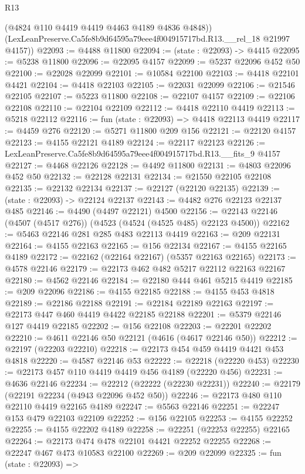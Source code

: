 \begin{lexlean}{R13}
\begin{coremodule}
        (@4824 @110 @4419 @4419 @4463 @4189 @4836 @4848))
      (LexLeanPreserve.Ca5fe8b9d64595a79eee4f004915717bd.R13.__rel_18 @21997 @4157))
@22093 := @4488 @11800
@22094 := (state : @22093) -> @4415
@22095 := @5238 @11800
@22096 := @22095 @4157
@22099 := @5237 @22096 @452 @50
@22100 := @22028 @22099
@22101 := @10584 @22100
@22103 := @4418 @22101 @4421
@22104 := @4418 @22103
@22105 := @22031 @22099
@22106 := @21546 @22105
@22107 := @5223 @11800
@22108 := @22107 @4157
@22109 := @22106 @22108
@22110 := @22104 @22109
@22112 := @4418 @22110 @4419
@22113 := @5218 @22112
@22116 := fun (state : @22093) => @4418 @22113 @4419
@22117 := @4459 @276
@22120 := @5271 @11800 @209 @156
@22121 := @22120 @4157
@22123 := @4155 @22121 @4189
@22124 := @22117 @22123
@22126 := LexLeanPreserve.Ca5fe8b9d64595a79eee4f004915717bd.R13.__fits_9 @4157
@22127 := @4468 @22126
@22128 := @4492 @11800
@22131 := @4803 @22096 @452 @50
@22132 := @22128 @22131
@22134 := @21550 @22105 @22108
@22135 := @22132 @22134
@22137 := @22127 (@22120 @22135)
@22139 := (state : @22093) -> @22124 @22137
@22143 := @4482 @276 @22123 @22137 @485
@22146 := @4490 (@4497 @22121) @4500
@22156 := @22143 @22146 (@4507 (@4517 @276)) (@4523 (@4524 (@4525 @485) @22123 @4500))
@22162 := @5463 @22146 @281 @285 @483 @22113 @4419
@22163 := @209 @22131
@22164 := @4155 @22163
@22165 := @156 @22134
@22167 := @4155 @22165 @4189
@22172 := @22162 (@22164 @22167) (@5357 @22163 @22165)
@22173 := @4578 @22146
@22179 := @22173 @462 @482 @5217 @22112 @22163 @22167
@22180 := @4562 @22146
@22184 := @22180 @444 @461 @5215 @4419
@22185 := @209 @22096
@22186 := @4155 @22185
@22188 := @4155 @453 @4818
@22189 := @22186 @22188
@22191 := @22184 @22189 @22163
@22197 := @22173 @447 @460 @4419 @4422 @22185 @22188
@22201 := @5379 @22146 @127 @4419 @22185
@22202 := @156 @22108
@22203 := @22201 @22202
@22210 := @4611 @22146 @50 @22121 (@4616 (@4617 @22146 @50))
@22212 := @22197 (@22203 @22210)
@22218 := @22173 @454 @459 @4419 @4421 @453 @4818
@22220 := @4587 @22146 @53
@22222 := @22218 (@22220 @453)
@22230 := @22173 @457 @110 @4419 @4419 @456 @4189 (@22220 @456)
@22231 := @4636 @22146
@22234 := @22212 (@22222 (@22230 @22231))
@22240 := @22179 (@22191 @22234 (@4943 @22096 @452 @50))
@22246 := @22173 @480 @110 @22110 @4419 @22165 @4189
@22247 := @5563 @22146
@22251 := @22247 @153 @479 @22103 @22109
@22252 := @156 @22105
@22253 := @4155 @22252
@22255 := @4155 @22202 @4189
@22258 := @22251 (@22253 @22255) @22165
@22264 := @22173 @474 @478 @22101 @4421 @22252 @22255
@22268 := @22247 @467 @473 @10583 @22100
@22269 := @209 @22099
@22325 := fun (state : @22093) =>

\end{coremodule}
\end{lexlean}
